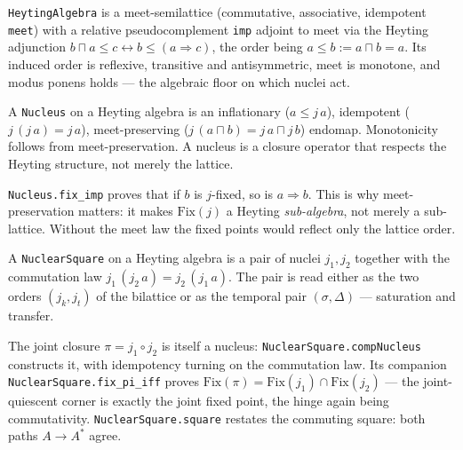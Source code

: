 \begin{definition}\label{def:heyting}\leanok{}
\texttt{HeytingAlgebra} is a meet-semilattice (commutative, associative, idempotent \texttt{meet}) with a relative pseudocomplement \texttt{imp} adjoint to meet via the Heyting adjunction $b \sqcap a \leq c \leftrightarrow b \leq (a \Rightarrow c)$, the order being $a \leq b := a \sqcap b = a$. Its induced order is reflexive, transitive and antisymmetric, meet is monotone, and modus ponens holds --- the algebraic floor on which nuclei act.
\end{definition}

\begin{definition}[Nucleus]\label{def:nucleus}\leanok{}
A \texttt{Nucleus} on a Heyting algebra is an inflationary ($a \leq j\,a$), idempotent ($j\,(j\,a) = j\,a$), meet-preserving ($j\,(a \sqcap b) = j\,a \sqcap j\,b$) endomap. Monotonicity follows from meet-preservation. A nucleus is a closure operator that respects the Heyting structure, not merely the lattice.
\end{definition}

\begin{theorem}\label{thm:fix-imp}\leanok{}
\texttt{Nucleus.fix\_imp} proves that if $b$ is $j$-fixed, so is $a \Rightarrow b$. This is why meet-preservation matters: it makes $\mathrm{Fix}(j)$ a Heyting \emph{sub-algebra}, not merely a sub-lattice. Without the meet law the fixed points would reflect only the lattice order.
\end{theorem}

\begin{definition}\label{def:nuclear-square}\leanok{}
A \texttt{NuclearSquare} on a Heyting algebra is a pair of nuclei $j_1, j_2$ together with the commutation law $j_1\,(j_2\,a) = j_2\,(j_1\,a)$. The pair is read either as the two orders $(j_k, j_t)$ of the bilattice or as the temporal pair $(\sigma, \Delta)$ --- saturation and transfer.
\end{definition}

\begin{theorem}\label{thm:nuclear-quartet}\leanok{}
The joint closure $\pi = j_1 \circ j_2$ is itself a nucleus: \texttt{NuclearSquare.compNucleus} constructs it, with idempotency turning on the commutation law. Its companion \texttt{NuclearSquare.fix\_pi\_iff} proves $\mathrm{Fix}(\pi) = \mathrm{Fix}(j_1) \cap \mathrm{Fix}(j_2)$ --- the joint-quiescent corner is exactly the joint fixed point, the hinge again being commutativity. \texttt{NuclearSquare.square} restates the commuting square: both paths $A \to A^{*}$ agree.
\end{theorem}

